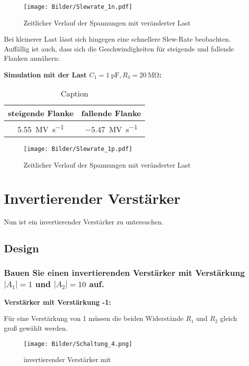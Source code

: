 \begin{figure}[H]
    \centering
    \texttt{[image: Bilder/Slewrate\_1n.pdf]}
    \caption{Zeitlicher Verlauf der Spannungen mit veränderter Last}
\end{figure}

Bei kleinerer Last lässt sich hingegen eine schnellere Slew-Rate beobachten. Auffällig ist auch, dass sich die Geschwindigkeiten für steigende und fallende Flanken annähern:

\textbf{Simulation mit der Last $C_1 = \SI{1}{\pico \farad}, R_3 = \SI{20}{\mega \ohm}$:}

\begin{table}[H]
    \centering
    \begin{tabular}{|c|c|}
    \hline
         steigende Flanke & fallende Flanke  \\ \hline
         \SI{5.55}{\mega \volt \per \second} & \SI{-5.47}{\mega \volt \per \second} \\ \hline
    \end{tabular}
    \caption{Caption}
    \label{tab:my_label}
\end{table}

\begin{figure}[H]
    \centering
    \texttt{[image: Bilder/Slewrate\_1p.pdf]}
    \caption{Zeitlicher Verlauf der Spannungen mit veränderter Last}
\end{figure}

\section{Invertierender Verstärker}
Nun ist ein invertierender Verstärker zu untersuchen.
\subsection{Design}
\subsubsection{Bauen Sie einen invertierenden Verstärker mit Verstärkung $|A_1|=1$ und $|A_2|=10$ auf.}

\textbf{Verstärker mit Verstärkung -1:}

Für eine Verstärkung von 1 müssen die beiden Widerstände $R_1$ und $R_2$ gleich groß gewählt werden.

\begin{figure}[H]
    \centering
    \texttt{[image: Bilder/Schaltung\_4.png]}
    \caption{invertierender Verstärker mit }
    \label{fig:my_label}
\end{figure}


